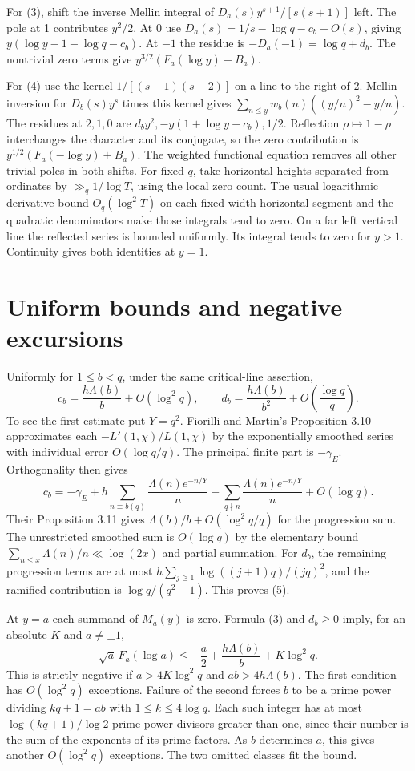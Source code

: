 \documentclass[11pt,a4paper]{article}
\newcommand{\head}[1]{\section*{\color{ink}#1}}
\begin{document}
For (3), shift the inverse Mellin integral of \(D_a(s)y^{s+1}/[s(s+1)]\) left.
The pole at 1 contributes \(y^2/2\). At 0 use
\(D_a(s)=1/s-\log q-c_b+O(s)\), giving \(y(\log y-1-\log q-c_b)\).
At \(-1\) the residue is \(-D_a(-1)=\log q+d_b\). The nontrivial
zero terms give \(y^{3/2}(F_a(\log y)+B_a)\).

For (4) use the kernel \(1/[(s-1)(s-2)]\) on a line to the right of 2.
Mellin inversion for \(D_b(s)y^s\) times this kernel gives
\(\sum_{n\le y}w_b(n)((y/n)^2-y/n)\).
The residues at \(2,1,0\) are \(d_b y^2,-y(1+\log y+c_b),1/2\).
Reflection \(\rho\mapsto1-\rho\) interchanges the character and its conjugate,
so the zero contribution is \(y^{1/2}(F_a(-\log y)+B_a)\).
The weighted functional equation removes all other trivial poles in both shifts.
For fixed \(q\), take horizontal heights separated from ordinates by
\(\gg_q1/\log T\), using the local zero count. The usual logarithmic derivative
bound \(O_q(\log^2 T)\) on each fixed-width horizontal segment and the quadratic
denominators make those integrals tend to zero. On a far left vertical line the
reflected series is bounded uniformly. Its integral tends to zero for \(y>1\).
Continuity gives both identities at \(y=1\).

\newpage
\head{Uniform bounds and negative excursions}
Uniformly for \(1\le b<q\), under the same critical-line assertion,
\begin{equation}
 c_b=\frac{h\Lambda(b)}{b}+O(\log^2q),\qquad
 d_b=\frac{h\Lambda(b)}{b^2}+O\!\left(\frac{\log q}{q}\right).
\end{equation}
To see the first estimate put \(Y=q^2\). Fiorilli and Martin's
\href{https://arxiv.org/pdf/0912.4908#page=31}{Proposition 3.10}
approximates each \(-L'(1,\chi)/L(1,\chi)\) by the exponentially smoothed series
with individual error \(O(\log q/q)\). The principal finite part is \(-\gamma_E\).
Orthogonality then gives
\[
 c_b=-\gamma_E+h\sum_{n\equiv b(q)}\frac{\Lambda(n)e^{-n/Y}}n
                -\sum_{q\nmid n}\frac{\Lambda(n)e^{-n/Y}}n+O(\log q).
\]
Their Proposition 3.11 gives \(\Lambda(b)/b+O(\log^2q/q)\) for the progression
sum. The unrestricted smoothed sum is \(O(\log q)\) by the elementary
bound \(\sum_{n\le x}\Lambda(n)/n\ll\log(2x)\) and partial summation.
For \(d_b\), the remaining progression terms are at most
\(h\sum_{j\ge1}\log((j+1)q)/(jq)^2\), and the ramified contribution is
\(\log q/(q^2-1)\). This proves (5).

At \(y=a\) each summand of \(M_a(y)\) is zero. Formula (3) and \(d_b\ge0\)
imply, for an absolute \(K\) and \(a\ne\pm1\),
\[
 \sqrt a\,F_a(\log a)\le-\frac a2+\frac{h\Lambda(b)}b+K\log^2q .
\]
This is strictly negative if \(a>4K\log^2q\) and \(ab>4h\Lambda(b)\).
The first condition has \(O(\log^2q)\) exceptions. Failure of the second
forces \(b\) to be a prime power dividing \(kq+1=ab\) with
\(1\le k\le4\log q\). Each such integer has at most
\(\log(kq+1)/\log 2\) prime-power divisors greater than one, since their number is
the sum of the exponents of its prime factors. As \(b\) determines \(a\), this
gives another \(O(\log^2q)\) exceptions. The two omitted classes fit the bound.
\end{document}

